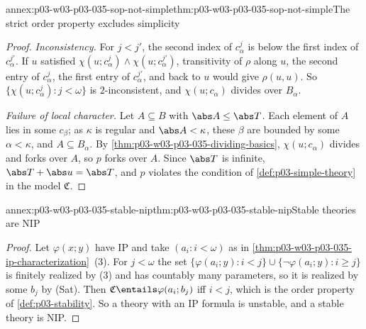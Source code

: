 \begin{annexitem}{annex:p03-w03-p03-035-sop-not-simple}{thm:p03-w03-p03-035-sop-not-simple}{The strict order property excludes simplicity}
\begin{proof}
\emph{Inconsistency.}  For \(j<j'\), the second index of \(c^j_\alpha\) is
below the first index of \(c^{j'}_\alpha\).  If \(u\) satisfied
\(\chi(u;c^j_\alpha)\wedge\chi(u;c^{j'}_\alpha)\), transitivity of \(\rho\)
along \(u\), the second entry of \(c^j_\alpha\), the first entry of
\(c^{j'}_\alpha\), and back to \(u\) would give \(\rho(u,u)\).  So
\(\{\chi(u;c^j_\alpha):j<\omega\}\) is \(2\)-inconsistent, and
\(\chi(u;c_\alpha)\) divides over \(B_\alpha\).

\emph{Failure of local character.}  Let \(A\subseteq B\) with
\(\abs A\leq\abs T\).  Each element of \(A\) lies in some \(c_\beta\); as
\(\kappa\) is regular and \(\abs A<\kappa\), these \(\beta\) are bounded by some
\(\alpha<\kappa\), and \(A\subseteq B_\alpha\).  By
\cref{thm:p03-w03-p03-035-dividing-basics}, \(\chi(u;c_\alpha)\) divides and
forks over \(A\), so \(p\) forks over \(A\).  Since \(\abs T\) is infinite,
\(\abs T+\abs u=\abs T\), and \(p\) violates the condition of
\cref{def:p03-simple-theory} in the model \(\mathfrak C\).
\end{proof}
\end{annexitem}

\begin{annexitem}{annex:p03-w03-p03-035-stable-nip}{thm:p03-w03-p03-035-stable-nip}{Stable theories are NIP}
\begin{proof}
Let \(\varphi(x;y)\) have IP and take \((a_i:i<\omega)\) as in
\cref{thm:p03-w03-p03-035-ip-characterization}~(3).  For \(j<\omega\) the set
\(\{\varphi(a_i;y):i<j\}\cup\{\neg\varphi(a_i;y):i\geq j\}\) is finitely
realized by (3) and has countably many parameters, so it is realized by some
\(b_j\) by (Sat).  Then \(\mathfrak C\entails\varphi(a_i;b_j)\) iff \(i<j\),
which is the order property of \cref{def:p03-stability}.  So a theory with an
IP formula is unstable, and a stable theory is NIP.
\end{proof}
\end{annexitem}

